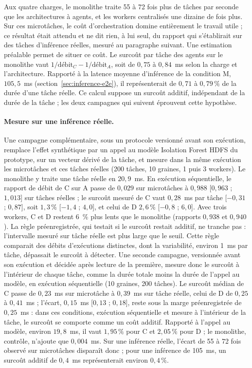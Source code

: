 Aux quatre charges, le monolithe traite 55 à 72 fois plus de tâches par seconde que les architectures à agents, et les workers centralisés une dizaine de fois plus. Sur ces microtâches, le coût d'orchestration domine entièrement le travail utile ; ce résultat était attendu et ne dit rien, à lui seul, du rapport qui s'établirait sur des tâches d'inférence réelles, mesuré au paragraphe suivant. Une estimation préalable permet de situer ce coût. Le surcoût par tâche des agents sur le monolithe vaut $1/\text{débit}_{C} - 1/\text{débit}_{A}$, soit de $0{,}75$ à $0{,}84$~ms selon la charge et l'architecture. Rapporté à la latence moyenne d'inférence de la condition M, $105{,}5$~ms (section~\ref{sec:inference-e2e}), il représenterait de $0{,}71$ à $0{,}79\,\%$ de la durée d'une tâche réelle. Ce calcul suppose un surcoût additif, indépendant de la durée de la tâche ; les deux campagnes qui suivent éprouvent cette hypothèse.

\paragraph{Mesure sur une inférence réelle.} Une campagne complémentaire, sous un protocole versionné avant son exécution, remplace l'effet synthétique par un appel au modèle Isolation Forest HDFS du prototype, sur un vecteur dérivé de la tâche, et mesure dans la même exécution les microtâches et ces tâches réelles (200 tâches, 10 graines, 1 puis 3 workers). Le monolithe y traite une tâche réelle en $20{,}9$~ms. En exécution séquentielle, le rapport de débit de C sur A passe de $0{,}029$ sur microtâches à $0{,}988$ [$0{,}963$ ; $1{,}013$] sur tâches réelles ; le surcoût mesuré de C vaut $0{,}28$~ms par tâche [$-0{,}31$ ; $0{,}87$], soit $1{,}3\,\%$ [$-1{,}4$ ; $4{,}0$], et celui de D $2{,}6\,\%$ [$-0{,}8$ ; $6{,}0$]. Avec trois workers, C et D restent 6~\% plus lents que le monolithe (rapports $0{,}938$ et $0{,}940$). La règle préenregistrée, qui testait si le surcoût restait additif, ne tranche pas : l'intervalle mesuré sur tâche réelle est plus large que le seuil. Cette règle comparait des débits d'exécutions distinctes, dont la variabilité, environ 1~ms par tâche, dépassait le surcoût à détecter. Une seconde campagne, versionnée avant son exécution et décidée après lecture de la première, mesure donc le surcoût à l'intérieur de chaque tâche, comme la durée totale moins la durée de l'appel au modèle, en exécution séquentielle (10 graines, 200 tâches). Le surcoût médian de C passe de $0{,}23$~ms sur microtâche à $0{,}39$~ms sur tâche réelle, celui de D de $0{,}25$ à $0{,}41$~ms ; l'écart, $0{,}15$~ms [$0{,}13$ ; $0{,}18$], reste sous la marge préenregistrée de $0{,}25$~ms : dans ces conditions, exécution séquentielle et mesure à l'intérieur de la tâche, le surcoût se comporte comme un coût additif. Rapporté à l'appel au modèle, environ $19{,}8$~ms, il vaut $1{,}95\,\%$ pour C et $2{,}05\,\%$ pour D ; le monolithe, contrôle, n'ajoute que $0{,}004$~ms. Sur une inférence réelle, l'écart de 55 à 72 fois observé sur microtâches disparaît donc ; pour une inférence de 105~ms, un surcoût additif de $0{,}4$~ms représenterait environ $0{,}4\,\%$.

